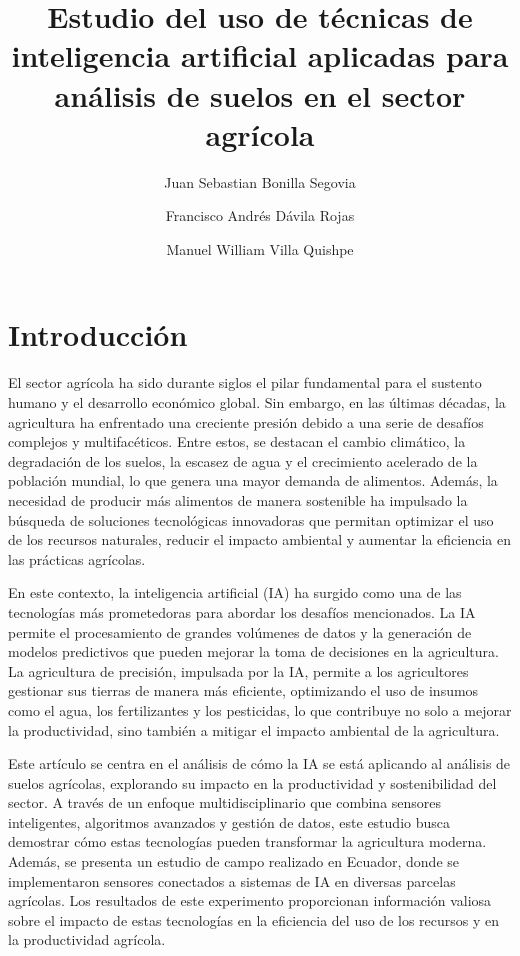 \documentclass[9pt,twocolumn,twoside]{opticajnl}
\title{Estudio del uso de técnicas de inteligencia artificial aplicadas para análisis de suelos en el sector agrícola}
\author[1]{Juan Sebastian Bonilla Segovia}
\author[2]{Francisco Andrés Dávila Rojas}
\author[3]{Manuel William Villa Quishpe}
\affil[*]{\textbf{Resumen realizado por: Fernanda Elizabeth Basurto Muñoz}}
\affil[*]{\textbf{Enlace de los archivos: https://github.com/FernandaBasurto/Latex-archivos.git}}
\begin{document}
\maketitle

\section{Introducción}
El sector agrícola ha sido durante siglos el pilar fundamental para el sustento humano y el desarrollo económico global. Sin embargo, en las últimas décadas, la agricultura ha enfrentado una creciente presión debido a una serie de desafíos complejos y multifacéticos. Entre estos, se destacan el cambio climático, la degradación de los suelos, la escasez de agua y el crecimiento acelerado de la población mundial, lo que genera una mayor demanda de alimentos. Además, la necesidad de producir más alimentos de manera sostenible ha impulsado la búsqueda de soluciones tecnológicas innovadoras que permitan optimizar el uso de los recursos naturales, reducir el impacto ambiental y aumentar la eficiencia en las prácticas agrícolas.

En este contexto, la inteligencia artificial (IA) ha surgido como una de las tecnologías más prometedoras para abordar los desafíos mencionados. La IA permite el procesamiento de grandes volúmenes de datos y la generación de modelos predictivos que pueden mejorar la toma de decisiones en la agricultura. La agricultura de precisión, impulsada por la IA, permite a los agricultores gestionar sus tierras de manera más eficiente, optimizando el uso de insumos como el agua, los fertilizantes y los pesticidas, lo que contribuye no solo a mejorar la productividad, sino también a mitigar el impacto ambiental de la agricultura.

Este artículo se centra en el análisis de cómo la IA se está aplicando al análisis de suelos agrícolas, explorando su impacto en la productividad y sostenibilidad del sector. A través de un enfoque multidisciplinario que combina sensores inteligentes, algoritmos avanzados y gestión de datos, este estudio busca demostrar cómo estas tecnologías pueden transformar la agricultura moderna. Además, se presenta un estudio de campo realizado en Ecuador, donde se implementaron sensores conectados a sistemas de IA en diversas parcelas agrícolas. Los resultados de este experimento proporcionan información valiosa sobre el impacto de estas tecnologías en la eficiencia del uso de los recursos y en la productividad agrícola.
\end{document}
